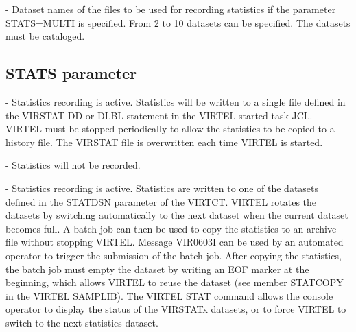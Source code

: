 \documentclass[letterpaper,10pt,english]{sphinxmanual}
\begin{document}
 - Dataset names of the files to be used for recording statistics if the parameter STATS=MULTI is specified. From 2 to 10 datasets can be specified. The datasets must be cataloged.

\ignorespaces 

\subsection{STATS parameter}
\label{\detokenize{Installation_Guide:stats-parameter}}\label{\detokenize{Installation_Guide:index-117}}
\begin{sphinxVerbatim}[commandchars=\\\{\}]
     
\end{sphinxVerbatim}

 - Statistics recording is active. Statistics will be written to a single file defined in the VIRSTAT DD or DLBL statement in the VIRTEL started task JCL. VIRTEL must be stopped periodically to allow the statistics to be copied to a history file. The VIRSTAT file is overwritten each time VIRTEL is started.

 - Statistics will not be recorded.

 - Statistics recording is active. Statistics are written to one of the datasets defined in the STATDSN parameter of the VIRTCT. VIRTEL rotates the datasets by switching automatically to the next dataset when the current dataset becomes full. A batch job can then be used to copy the statistics to an archive file without stopping VIRTEL. Message VIR0603I can be used by an automated operator to trigger the submission of the batch job. After copying the statistics, the batch job must empty the dataset by writing an EOF marker at the beginning, which allows VIRTEL to reuse the dataset (see member STATCOPY in the VIRTEL SAMPLIB).
The VIRTEL STAT command allows the console operator to display the status of the VIRSTATx datasets, or to force VIRTEL to switch to the next statistics dataset.
\end{document}
